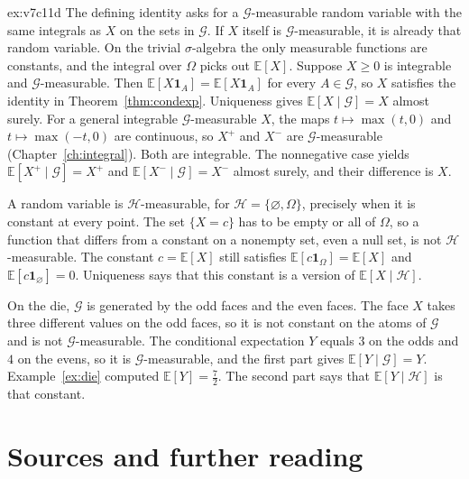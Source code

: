 \begin{solution}{ex:v7c11d}
\idea The defining identity asks for a $\mathcal G$-measurable random variable with the same integrals as $X$ on the sets in $\mathcal G$. If $X$ itself is $\mathcal G$-measurable, it is already that random variable. On the trivial $\sigma$-algebra the only measurable functions are constants, and the integral over $\Omega$ picks out $\mathbb E[X]$.
\writeup Suppose $X\ge0$ is integrable and $\mathcal G$-measurable. Then $\mathbb E[X\mathbf 1_A]=\mathbb E[X\mathbf 1_A]$ for every $A\in\mathcal G$, so $X$ satisfies the identity in Theorem~\ref{thm:condexp}. Uniqueness gives $\mathbb E[X\mid\mathcal G]=X$ almost surely. For a general integrable $\mathcal G$-measurable $X$, the maps $t\mapsto\max(t,0)$ and $t\mapsto\max(-t,0)$ are continuous, so $X^+$ and $X^-$ are $\mathcal G$-measurable (Chapter~\ref{ch:integral}). Both are integrable. The nonnegative case yields $\mathbb E[X^+\mid\mathcal G]=X^+$ and $\mathbb E[X^-\mid\mathcal G]=X^-$ almost surely, and their difference is $X$.

A random variable is $\mathcal H$-measurable, for $\mathcal H=\{\varnothing,\Omega\}$, precisely when it is constant at every point. The set $\{X=c\}$ has to be empty or all of $\Omega$, so a function that differs from a constant on a nonempty set, even a null set, is not $\mathcal H$-measurable. The constant $c=\mathbb E[X]$ still satisfies $\mathbb E[c\mathbf 1_\Omega]=\mathbb E[X]$ and $\mathbb E[c\mathbf 1_\varnothing]=0$. Uniqueness says that this constant is a version of $\mathbb E[X\mid\mathcal H]$.

On the die, $\mathcal G$ is generated by the odd faces and the even faces. The face $X$ takes three different values on the odd faces, so it is not constant on the atoms of $\mathcal G$ and is not $\mathcal G$-measurable. The conditional expectation $Y$ equals $3$ on the odds and $4$ on the evens, so it is $\mathcal G$-measurable, and the first part gives $\mathbb E[Y\mid\mathcal G]=Y$. Example~\ref{ex:die} computed $\mathbb E[Y]=\frac72$. The second part says that $\mathbb E[Y\mid\mathcal H]$ is that constant.
\end{solution}

\section*{Sources and further reading}

